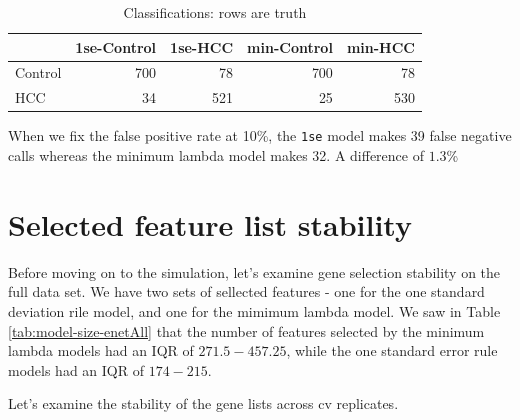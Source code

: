 \documentclass[
]{book}
\begin{document}
\begin{table}

\caption{\label{tab:enet-get-sample-class}Classifications: rows are truth}
\centering
\begin{tabular}[t]{l|r|r|r|r}
\hline
  & 1se-Control & 1se-HCC & min-Control & min-HCC\\
\hline
Control & 700 & 78 & 700 & 78\\
\hline
HCC & 34 & 521 & 25 & 530\\
\hline
\end{tabular}
\end{table}

When we fix the false positive rate at 10\%, the \texttt{1se} model makes 39 false
negative calls whereas the minimum lambda model makes 32. A difference
of \(1.3\)\%

\hypertarget{selected-feature-list-stability-1}{%
\section*{Selected feature list stability}\label{selected-feature-list-stability-1}}

Before moving on to the simulation, let's examine gene selection stability on the
full data set. We have two sets of sellected features - one for the
one standard deviation rile model, and one for the mimimum lambda model.
We saw in Table \ref{tab:model-size-enetAll} that the number of features
selected by the minimum lambda models had an IQR of
\(271.5-457.25\),
while the one standard error rule models had an IQR of
\(174-215\).

Let's examine the stability of the gene lists across cv replicates.
\end{document}
